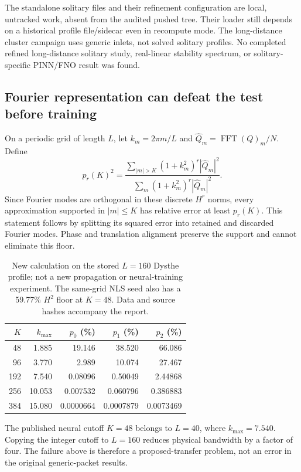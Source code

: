 \documentclass[11pt]{article}
\begin{document}
The standalone solitary files and their refinement configuration are local,
untracked work, absent from the audited pushed tree. Their loader still depends
on a historical profile file/sidecar even in recompute mode. The long-distance
cluster campaign uses generic inlets, not solved solitary profiles. No completed
refined long-distance solitary study, real-linear stability spectrum, or
solitary-specific PINN/FNO result was found.

\subsection{Fourier representation can defeat the test before training}
On a periodic grid of length $L$, let $k_m=2\pi m/L$ and
$\widehat Q_m=\operatorname{FFT}(Q)_m/N$. Define
\begin{equation}\label{eq:floor}
p_r(K)^2=\frac{\sum_{|m|>K}(1+k_m^2)^r|\widehat Q_m|^2}
                 {\sum_m(1+k_m^2)^r|\widehat Q_m|^2}.
\end{equation}
Since Fourier modes are orthogonal in these discrete $H^r$ norms, every
approximation supported in $|m|\leq K$ has relative error at least $p_r(K)$.
This statement follows by splitting its squared error into retained and
discarded Fourier modes. Phase and translation alignment preserve the support
and cannot eliminate this floor.

\begin{table}[h]\centering\small
\begin{tabular}{rrrrr}\toprule
$K$ & $k_{\max}$ & $p_0$ (\%) & $p_1$ (\%) & $p_2$ (\%)\\\midrule
48 & 1.885 & 19.146 & 38.520 & 66.086\\
96 & 3.770 & 2.989 & 10.074 & 27.467\\
192 & 7.540 & 0.08096 & 0.50049 & 2.44868\\
256 & 10.053 & 0.007532 & 0.060796 & 0.386883\\
384 & 15.080 & 0.0000664 & 0.0007879 & 0.0073469\\\bottomrule
\end{tabular}
\caption{New calculation on the stored $L=160$ Dysthe profile; not a new
propagation or neural-training experiment. The same-grid NLS seed also has a
59.77\% $H^2$ floor at $K=48$. Data and source hashes accompany the report.}
\end{table}

The published neural cutoff $K=48$ belongs to $L=40$, where $k_{\max}=7.540$.
Copying the integer cutoff to $L=160$ reduces physical bandwidth by a factor of
four. The failure above is therefore a proposed-transfer problem, not an error
in the original generic-packet results.
\end{document}
